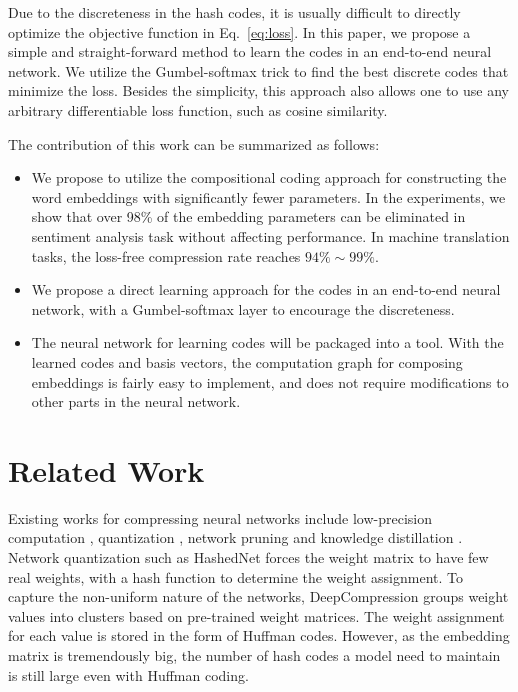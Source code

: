 \documentclass{article} %
\begin{document}
Due to the discreteness in the hash codes, it is usually difficult to directly optimize the objective function in Eq.~\ref{eq:loss}. In this paper, we propose a simple and straight-forward method to learn the codes in an end-to-end neural network. We utilize the Gumbel-softmax trick \citep{Maddison2016TheCD,Jang2016CategoricalRW} to find the best discrete codes that minimize the loss. Besides the simplicity, this approach also allows one to use any arbitrary differentiable loss function, such as cosine similarity.


The contribution of this work can be summarized as follows:

\begin{itemize}
    \item We propose to utilize the compositional coding approach for constructing the word embeddings with significantly fewer parameters. In the experiments, we show that over 98\% of the embedding parameters can be eliminated in sentiment analysis task without affecting performance. In machine translation tasks, the loss-free compression rate reaches $94\% \sim 99\%$.
    \item We propose a direct learning approach for the codes in an end-to-end neural network, with a Gumbel-softmax layer to encourage the discreteness.
    \item The neural network for learning codes will be packaged into a tool. With the learned codes and basis vectors, the computation graph for composing embeddings is fairly easy to implement, and does not require modifications to other parts in the neural network.
\end{itemize}


\section{Related Work}

Existing works for compressing neural networks include low-precision computation \citep{vanhoucke2011improving,hwang2014fixed,courbariaux2014low,Anwar2015FixedPO}, quantization \citep{Chen2015CompressingNN,han2015deep,Zhou2017IncrementalNQ}, network pruning \citep{LeCun1989OptimalBD,Hassibi1992SecondOD,Han2015LearningBW,Wen2016LearningSS} and knowledge distillation \citep{Hinton2015DistillingTK}. Network quantization such as HashedNet \citep{Chen2015CompressingNN} forces the weight matrix to have few real weights, with a hash function to determine the weight assignment. To capture the non-uniform nature of the networks, DeepCompression \citep{han2015deep} groups weight values into clusters based on pre-trained weight matrices. The weight assignment for each value is stored in the form of Huffman codes. However, as the embedding matrix is tremendously big, the number of hash codes a model need to maintain is still large even with Huffman coding.
\end{document}
